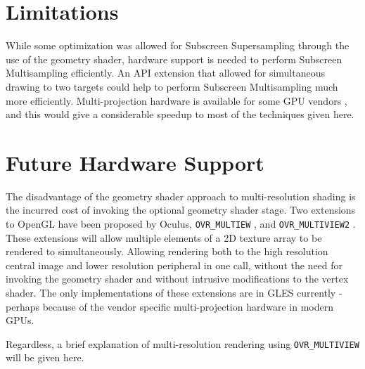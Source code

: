 \documentclass[12pt,a4paper,twoside,openright]{report}
\begin{document}
\section{Limitations}

While some optimization was allowed for Subscreen Supersampling through the use of the geometry shader, hardware support is needed to perform Subscreen Multisampling efficiently.
An API extension that allowed for simultaneous drawing to two targets could help to perform Subscreen Multisampling much more efficiently.
Multi-projection hardware is available for some GPU vendors \cite{multiResShading}, and this would give a considerable speedup to most of the techniques given here. 

\section{Future Hardware Support}

The disadvantage of the geometry shader approach to multi-resolution shading is the incurred cost of invoking the optional geometry shader stage.
Two extensions to OpenGL have been proposed by Oculus, \texttt{OVR\_MULTIEW} \cite{OVRmultiview}, and \texttt{OVR\_MULTIVIEW2} \cite{OVRmultiview2}. These extensions will allow multiple elements of a 2D texture array to be rendered to simultaneously. Allowing rendering both to the high resolution central image and lower resolution peripheral in one call, without the need for invoking the geometry shader and without intrusive modifications to the vertex shader. The only implementations of these extensions are in GLES currently - perhaps because of the vendor specific multi-projection hardware in modern GPUs.

Regardless, a brief explanation of multi-resolution rendering using \texttt{OVR\_MULTIVIEW} will be given here.
\end{document}
